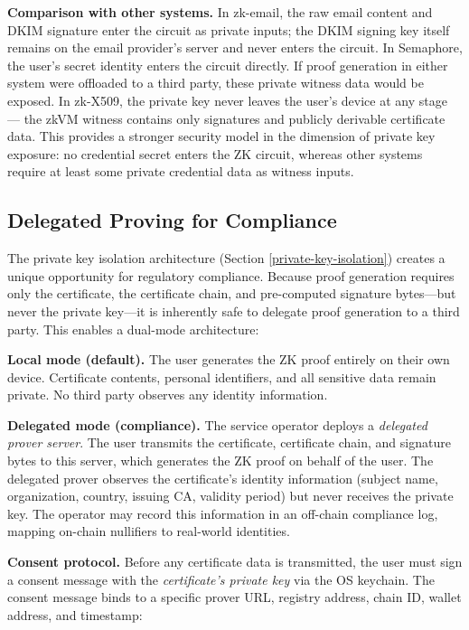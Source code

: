 \documentclass[11pt, a4paper]{article}
\begin{document}
\textbf{Comparison with other systems.} In zk-email, the raw email
content and DKIM signature enter the circuit as private inputs; the DKIM
signing key itself remains on the email provider's server and never
enters the circuit. In Semaphore, the user's secret identity enters the
circuit directly. If proof generation in either system were offloaded to
a third party, these private witness data would be exposed. In zk-X509,
the private key never leaves the user's device at any stage --- the zkVM
witness contains only signatures and publicly derivable certificate
data. This provides a stronger security model in the dimension of
private key exposure: no credential secret enters the ZK circuit,
whereas other systems require at least some private credential data as
witness inputs.

\subsection{Delegated Proving for
Compliance}\label{delegated-proving-for-compliance}

The private key isolation architecture (Section
\ref{private-key-isolation}) creates a unique opportunity for regulatory
compliance. Because proof generation requires only the certificate, the
certificate chain, and pre-computed signature bytes---but never the
private key---it is inherently safe to delegate proof generation to a
third party. This enables a dual-mode architecture:

\textbf{Local mode (default).} The user generates the ZK proof entirely
on their own device. Certificate contents, personal identifiers, and all
sensitive data remain private. No third party observes any identity
information.

\textbf{Delegated mode (compliance).} The service operator deploys a
\emph{delegated prover server}. The user transmits the certificate,
certificate chain, and signature bytes to this server, which generates
the ZK proof on behalf of the user. The delegated prover observes the
certificate's identity information (subject name, organization, country,
issuing CA, validity period) but never receives the private key. The
operator may record this information in an off-chain compliance log,
mapping on-chain nullifiers to real-world identities.

\textbf{Consent protocol.} Before any certificate data is transmitted,
the user must sign a consent message with the \emph{certificate's
private key} via the OS keychain. The consent message binds to a
specific prover URL, registry address, chain ID, wallet address, and
timestamp:
\end{document}
